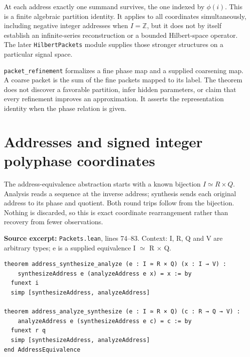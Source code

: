 \documentclass[11pt]{article}
\begin{document}
At each address exactly one summand survives, the one indexed by \(\phi(i)\). This is a finite algebraic partition identity. It applies to all coordinates simultaneously, including negative integer addresses when \(I=\mathbb Z\), but it does not by itself establish an infinite-series reconstruction or a bounded Hilbert-space operator. The later \texttt{HilbertPackets} module supplies those stronger structures on a particular signal space.

\texttt{packet\_refinement} formalizes a fine phase map and a supplied coarsening map. A coarse packet is the sum of the fine packets mapped to its label. The theorem does not discover a favorable partition, infer hidden parameters, or claim that every refinement improves an approximation. It asserts the representation identity when the phase relation is given.

\hypertarget{addresses-and-signed-integer-polyphase-coordinates}{%
\section{Addresses and signed integer polyphase coordinates}\label{addresses-and-signed-integer-polyphase-coordinates}}

The address-equivalence abstraction starts with a known bijection \(I\simeq R\times Q\). Analysis reads a sequence at the inverse address; synthesis sends each original address to its phase and quotient. Both round trips follow from the bijection. Nothing is discarded, so this is exact coordinate rearrangement rather than recovery from fewer observations.

\textbf{Source excerpt:} \texttt{Packets.lean}, lines 74--83. Context: I, R, Q and V are arbitrary types; e is a supplied equivalence I \ensuremath{\simeq} R \ensuremath{\times} Q.

\begin{minipage}{\linewidth}
\begin{lstlisting}
theorem address_synthesize_analyze (e : I ≃ R × Q) (x : I → V) :
    synthesizeAddress e (analyzeAddress e x) = x := by
  funext i
  simp [synthesizeAddress, analyzeAddress]

theorem address_analyze_synthesize (e : I ≃ R × Q) (c : R → Q → V) :
    analyzeAddress e (synthesizeAddress e c) = c := by
  funext r q
  simp [synthesizeAddress, analyzeAddress]
end AddressEquivalence
\end{lstlisting}
\end{minipage}\par
\end{document}

